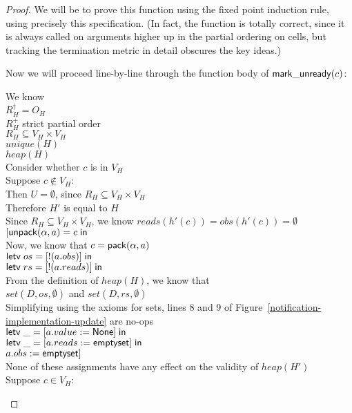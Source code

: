 \begin{proof}
We will be to prove this function using the fixed point induction
rule, using precisely this specification. (In fact, the function is
totally correct, since it is always called on arguments higher up in
the partial ordering on cells, but tracking the termination metric in
detail obscures the key ideas.)

Now we will proceed line-by-line through the function body of $\mathsf{mark\_unready}(c)$: 

\begin{tabbedproof}
\oo We know \\
\oox $R^\dagger_H = O_H$ \\
\oox $R^+_H$ strict partial order \\
\oox $R_H \subseteq V_H \times V_H$ \\
\oox $\mathit{unique}(H)$ \\
\oox $\mathit{heap}(H)$ \\
\ooo Consider whether $c$ is in $V_H$ \\
\ooo Suppose $c \not\in V_H$: \\
\oooo Then $U = \emptyset$, since $R_H \subseteq V_H \times V_H$ \\ 
\oooo Therefore $H'$ is equal to $H$ \\
\oooo Since $R_H \subseteq V_H \times V_H$, we know $\mathit{reads}(h'(c)) = \mathit{obs}(h'(c)) = \emptyset$ \\
\oooo $[\mathsf{unpack}({\alpha}, {a}) = {c} \;\mathsf{in}\;{}$ \\
\oooo Now, we know that $c = \mathsf{pack}({\alpha}, {a})$ \\
\oooo $\mathsf{letv}\;os = [!(a.obs)]\;\mathsf{in}\;$ \\
\oooo $\mathsf{letv}\;rs = [!(a.reads)]\;\mathsf{in}\;$ \\
\oooo From the definition of $\mathit{heap}(H)$, we know that  \\
\oooo $\mathit{set}(D, os, \emptyset)$ and $\mathit{set}(D, rs, \emptyset)$ \\
\oooo Simplifying using the axioms for sets, lines 8 and 9 of Figure~\ref{notification-implementation-update} are no-ops \\
\oooo $\mathsf{letv}\;\_ = [a.value := \mathsf{None}]\;\mathsf{in}\;$ \\
\oooo $\mathsf{letv}\;\_ = [a.reads := \mathsf{emptyset}]\;\mathsf{in}\;$ \\
\oooo $a.obs := \mathsf{emptyset}]$ \\
\oooo None of these assignments have any effect on the validity of $\mathit{heap}(H')$ \\
\ooo Suppose $c \in V_H$: \\

\end{tabbedproof}
\end{proof}
